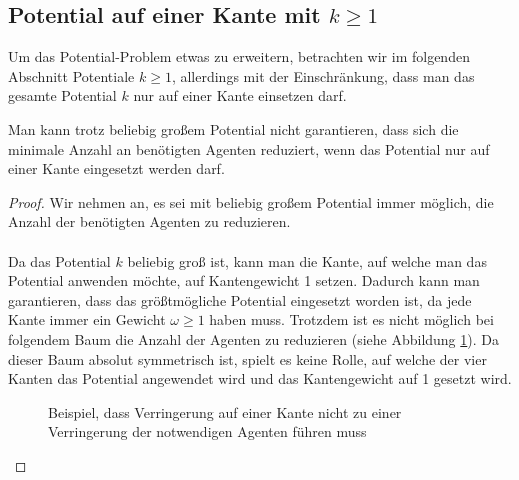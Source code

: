 \subsection{Potential auf einer Kante mit $k \geq 1$}\label{kap_pot>=1}


Um das Potential-Problem etwas zu erweitern, betrachten wir im folgenden Abschnitt Potentiale $k \geq 1$, allerdings mit der Einschränkung, dass man das gesamte Potential $k$ nur auf einer Kante einsetzen darf.

\begin{theorem}
	Man kann trotz beliebig großem Potential nicht garantieren, dass sich die minimale Anzahl an benötigten Agenten reduziert, wenn das Potential nur auf einer Kante eingesetzt werden darf.
\end{theorem}

\begin{proof}
	Wir nehmen an, es sei mit beliebig großem Potential immer möglich, die Anzahl der benötigten Agenten zu reduzieren.
	\\
	\\	
	Da das Potential $k$ beliebig groß ist, kann man die Kante, auf welche man das Potential anwenden möchte, auf Kantengewicht 1 setzen. Dadurch kann man garantieren, dass das größtmögliche Potential eingesetzt worden ist, da jede Kante immer ein Gewicht $\omega \geq 1$ haben muss. Trotzdem ist es nicht möglich bei folgendem Baum die Anzahl der Agenten zu reduzieren (siehe Abbildung \ref{abb_gegenbeispielMaxPotential}). Da dieser Baum absolut symmetrisch ist, spielt es keine Rolle, auf welche der vier Kanten das Potential angewendet wird und das Kantengewicht auf 1 gesetzt wird.
	
	\begin{figure}[hbt]
		
		\captionsetup{width=0.9\textwidth}
		\caption{Beispiel, dass Verringerung auf einer Kante nicht zu einer Verringerung der notwendigen Agenten führen muss} 
		\label{abb_gegenbeispielMaxPotential}
	\end{figure} 
	

\end{proof}
